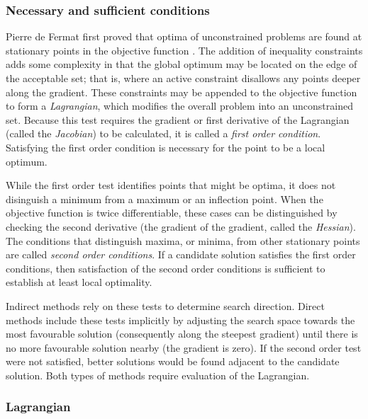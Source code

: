 \subsubsection{Necessary and sufficient conditions} \label{sub:Neccessary-and-sufficient}

Pierre de Fermat first proved that optima of unconstrained problems are found at stationary points in the objective function \parencite{Fermat}. The addition of inequality constraints adds some complexity in that the global optimum may be located on the edge of the acceptable set; that is, where an active constraint disallows any points deeper along the gradient. These constraints may be appended to the objective function to form a \emph{Lagrangian}, which modifies the overall problem into an unconstrained set. Because this test requires the gradient or first derivative of the Lagrangian (called the \emph{Jacobian}) to be calculated, it is called a \emph{first order condition}. Satisfying the first order condition is necessary for the point to be a local optimum.

While the first order test identifies points that might be optima, it does not disinguish a minimum from a maximum or an inflection point. When the objective function is twice differentiable, these cases can be distinguished by checking the second derivative (the gradient of the gradient, called the \emph{Hessian}). The conditions that distinguish maxima, or minima, from other stationary points are called \emph{second order conditions}. If a candidate solution satisfies the first order conditions, then satisfaction of the second order conditions is sufficient to establish at least local optimality.

Indirect methods rely on these tests to determine search direction. Direct methods include these tests implicitly by adjusting the search space towards the most favourable solution (consequently along the steepest gradient) until there is no more favourable solution nearby (the gradient is zero). If the second order test were not satisfied, better solutions would be found adjacent to the candidate solution. Both types of methods require evaluation of the Lagrangian.

\subsubsection{Lagrangian} \label{sub:Lagrangian}

